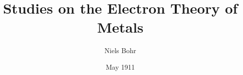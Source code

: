 \documentclass[a4paper]{article}
\title{Studies on the Electron Theory of Metals}
\author{\Large Niels Bohr \quad {\ttfamily\large nbx123@alumni.ku.dk}}
\date{May 1911}
\begin{document}
\begin{titlepage}
\maketitle
\end{titlepage}
\end{document}
